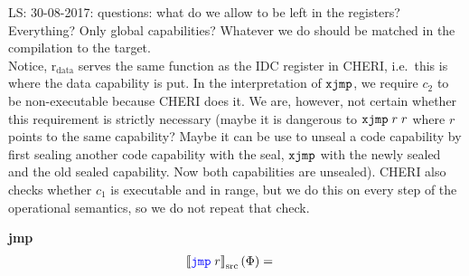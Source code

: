 \documentclass[a4paper]{article}
\newcommand\lau[1]{{\color{purple} \sf \footnotesize {LS: #1}}\\}
\newcommand{\sem}[1]{\left\llbracket #1 \right\rrbracket}
\newcommand{\ssem}[2][\Phi]{\sem{#2}_{\mathrm{src}}(#1)}
\newcommand{\sourcecolor}[1]{\color{blue}}
\newcommand{\src}[1]{{\sourcecolor{} #1}}
\newcommand{\targetcolor}[1]{\color{black}}
\newcommand{\trg}[1]{{\targetcolor{} #1}}
\newcommand{\zinstr}[1]{\texttt{#1}}
\newcommand{\oneinstr}[2]{
  \ifthenelse{\equal{#2}{}}
  {\zinstr{#1}}
  {\zinstr{#1} \; #2}
}
\newcommand{\twoinstr}[3]{
  \ifthenelse{\equal{#2#3}{}}
  {\zinstr{#1}}
  {\zinstr{#1} \; #2 \; #3}
}
\newcommand{\sjmp}[1]{\oneinstr{\src{jmp}}{#1}}
\newcommand{\sxjmp}[2]{\twoinstr{\trg{xjmp}}{#1}{#2}}
\newcommand{\rdata}{\mathrm{r}_\mathrm{data}}
\begin{document}
\lau{30-08-2017: questions: what do we allow to be left in the registers? Everything? Only global capabilities? Whatever we do should be matched in the compilation to the target.}

Notice, $\rdata$ serves the same function as the IDC register in CHERI, i.e.\ this is where the data capability is put. In the interpretation of $\sxjmp{}{}$, we require $c_2$ to be non-executable because CHERI does it. We are, however, not certain whether this requirement is strictly necessary (maybe it is dangerous to $\sxjmp{r}{r}$ where $r$ points to the same capability? Maybe it can be use to unseal a code capability by first sealing another code capability with the seal, $\sxjmp{}{}$ with the newly sealed and the old sealed capability. Now both capabilities are unsealed). CHERI also checks whether $c_1$ is executable and in range, but we do this on every step of the operational semantics, so we do not repeat that check.

\textbf{jmp}\\
\begin{align*}
  \ssem{\sjmp{r}} = & 
\end{align*}
\end{document}
